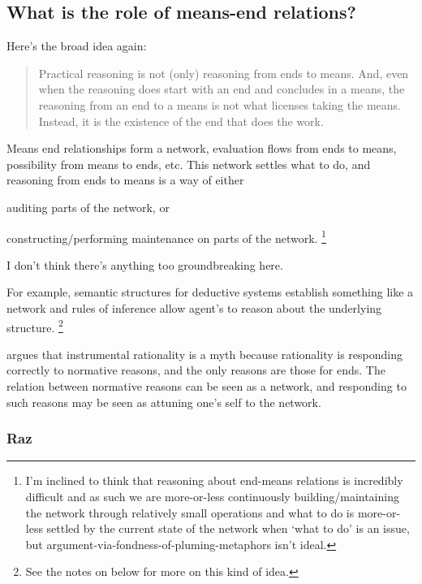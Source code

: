 \documentclass[10pt]{article}
\newcommand{\hozlinedash}[0]{%
  \noindent\hdashrule[0.5ex][c]{\textwidth}{.1pt}{2.5pt}
}
\begin{document}
\subsection*{What is the role of means-end relations?}
\label{sec:conclusion}

Here's the broad idea again:
\begin{quote}
  Practical reasoning is not (only) reasoning from ends to means.
  And, even when the reasoning does start with an end and concludes in a means, the reasoning from an end to a means is not what licenses taking the means.
  Instead, it is the existence of the end that does the work.
\end{quote}


Means end relationships form a network, evaluation flows from ends to means, possibility from means to ends, etc.
This network settles what to do, and reasoning from ends to means is a way of either
\begin{enumerate*}[label=\alph*)]
\item auditing parts of the network, or
\item constructing/performing maintenance on parts of the network.\nolinebreak
  \footnote{I'm inclined to think that reasoning about end-means relations is incredibly difficult and as such we are more-or-less continuously building/maintaining the network through relatively small operations and what to do is more-or-less settled by the current state of the network when `what to do' is an issue, but argument-via-fondness-of-pluming-metaphors isn't ideal.}
\end{enumerate*}

I don't think there's anything too groundbreaking here.

For example, semantic structures for deductive systems establish something like a network and rules of inference allow agent's to reason about the underlying structure.\nolinebreak
\footnote{See the notes on \citeauthor{Von-Wright:1972aa} below for more on this kind of idea.}

\citeauthor{Raz:2005aa} argues that instrumental rationality is a myth because rationality is responding correctly to normative reasons, and the only reasons are those for ends.
The relation between normative reasons can be seen as a network, and responding to such reasons may be seen as attuning one's self to the network.


\hozlinedash

\subsubsection*{Raz}
\label{sec:raz}
\end{document}
